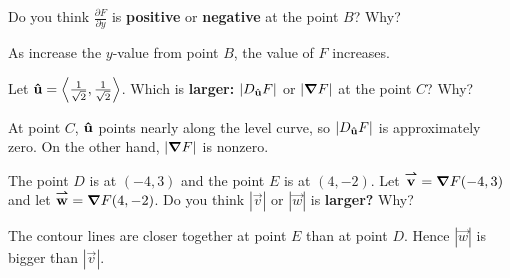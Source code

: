 \documentclass{ximera}
\begin{document}
\begin{problem}
  Do you think $\frac{\partial F}{\partial y}$ is \textbf{positive} or \textbf{negative} at the point $B$?  Why?
\begin{prompt}
  \begin{multipleChoice}
  \end{multipleChoice}
  \begin{feedback}
    As increase the $y$-value from point $B$, the value of $F$ increases.
  \end{feedback}
\end{prompt}

\vfill

\end{problem}

\begin{problem}
  Let $\mathbf{\hat{u}} = \left\langle  \frac{1}{\sqrt{2}}, \frac{1}{\sqrt{2}} \right\rangle$.  Which is \textbf{larger:} $|D_{\mathbf{\hat{u}}} F|$ or $|\boldsymbol\nabla F|$ at the point $C$?  Why?
  \begin{prompt}
    \begin{multipleChoice}
    \end{multipleChoice}
    \begin{feedback}
      At point $C$, $\mathbf{\hat{u}}$ points nearly along the level curve, so
      $|D_{\mathbf{\hat{u}}} F|$ is approximately zero. On the other hand,
      $|\boldsymbol\nabla F|$ is nonzero.
    \end{feedback}
  \end{prompt}

\vfill
  
\end{problem}


\begin{problem}
The point $D$ is at $(-4,3)$ and the point $E$ is at $(4,-2)$. Let
${\overset{\boldsymbol{\rightharpoonup}}{\mathbf{v}}} = \boldsymbol\nabla F(-4,3)$ and let ${\overset{\boldsymbol{\rightharpoonup}}{\mathbf{w}}} = \boldsymbol\nabla F(4,-2)$.  Do you
think $|\vec{v}|$ or $|\vec{w}|$ is \textbf{larger?}  Why?
\begin{prompt}
  \begin{multipleChoice}
  \end{multipleChoice}
  \begin{feedback}
    The contour lines are closer together at point $E$ than at point $D$. Hence $|\vec{w}|$ is bigger than $|\vec{v}|$.
  \end{feedback}
\end{prompt}

\vfill

\end{problem}
\end{document}

